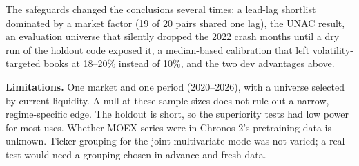 \documentclass[11pt]{article}
\begin{document}
The safeguards changed the conclusions several times: a lead-lag shortlist dominated by a market factor
(19 of 20 pairs shared one lag), the UNAC result, an evaluation universe that silently dropped the 2022 crash
months until a dry run of the holdout code exposed it, a median-based calibration that left volatility-targeted
books at 18--20\% instead of 10\%, and the two dev advantages above.

\textbf{Limitations.} One market and one period (2020--2026), with a universe selected by current liquidity. A
null at these sample sizes does not rule out a narrow, regime-specific edge. The holdout is short, so the
superiority tests had low power for most uses. Whether MOEX series were in Chronos-2's pretraining data is
unknown. Ticker grouping for the joint multivariate mode was not varied; a real test would need a grouping
chosen in advance and fresh data.

{\small\setlength{\bibsep}{1pt}

}
\end{document}
